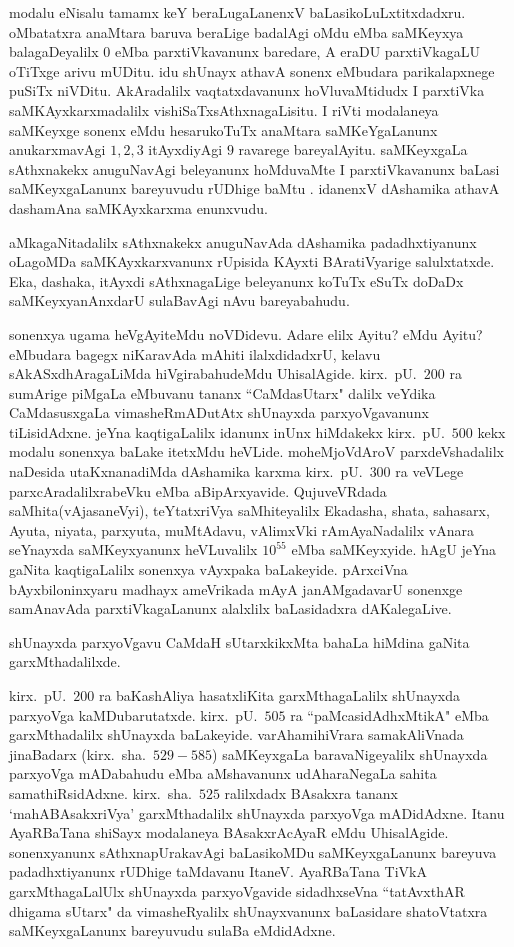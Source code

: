 modalu eNisalu tamamx keY beraLugaLanenxV baLasikoLuLxtitxdadxru. oMbatatxra anaMtara baruva beraLige badalAgi oMdu eMba saMKeyxya balagaDeyalilx $0$ eMba parxtiVkavanunx baredare, A eraDU parxtiVkagaLU oTiTxge arivu mUDitu. idu shUnayx athavA sonenx eMbudara parikalapxnege puSiTx niVDitu. AkAradalilx vaqtatxdavanunx hoVluvaMtidudx I parxtiVka saMKAyxkarxmadalilx vishiSaTxsAthxnagaLisitu. I riVti modalaneya saMKeyxge sonenx eMdu hesarukoTuTx anaMtara saMKeYgaLanunx anukarxmavAgi $1,2,3$ itAyxdi\-yAgi $9$ ravarege bareyalAyitu. saMKeyxgaLa sAthxnakekx anuguNavAgi beleyanunx hoMdu\-vaMte I parxtiVkavanunx baLasi saMKeyxgaLanunx bareyuvudu rUDhige baMtu . idanenxV dAshamika athavA dashamAna saMKAyxkarxma enunxvudu.

aMkagaNitadalilx sAthxnakekx anuguNavAda dAshamika padadhxtiyanunx oLagoMDa saMKAyx\-karxvanunx rUpisida KAyxti BAratiVyarige salulxtatxde. Eka, dashaka, itAyxdi sAthxnagaLige bele\-yanunx koTuTx eSuTx doDaDx saMKeyxyanAnxdarU sulaBavAgi nAvu bareyabahudu.

sonenxya ugama heVgAyiteMdu noVDidevu. Adare elilx Ayitu? eMdu Ayitu? eMbudara bagegx niKaravAda mAhiti ilalxdidadxrU, kelavu sAkASxdhAragaLiMda hiVgirabahudeMdu UhisalAgide. kirx.~pU.\ $200$ ra sumArige piMgaLa eMbuvanu tananx ``CaMdasUtarx" dalilx veYdika CaMdasusxgaLa vimasheRmADutAtx shUnayxda parxyoVgavanunx tiLisidAdxne. jeYna kaqtigaLalilx idanunx inUnx hiMdakekx kirx.~pU.\ $500$ kekx modalu sonenxya baLake itetxMdu heVLide. moheMjoVdAroV parxdeVshadalilx naDesida utaKxnanadiMda dAshamika karxma kirx.~pU.\ $300$ ra veVLege parxcAradalilxrabeVku eMba aBipArxyavide. QujuveVRdada saMhita(vAjasaneVyi), teYtatxriVya saMhiteyalilx Ekadasha, shata, sahasarx, Ayuta, niyata, parxyuta, muMtAdavu, vAlimxVki rAmAyaNadalilx vAnara seYnayxda saMKeyxyanunx heVLuvalilx $10^{55}$ eMba saMKeyxyide. hAgU jeYna gaNita kaqtigaLalilx sonenxya vAyxpaka baLakeyide. pArxciVna bAyxbiloninxyaru madhayx ameVrikada mAyA janAMgadavarU sonenxge samAnavAda parxtiVkagaLanunx alalxlilx baLasidadxra dAKalegaLive. 

shUnayxda parxyoVgavu CaMdaH sUtarxkikxMta bahaLa hiMdina gaNita garxMthadalilxde.

kirx.~pU.\ $200$ ra baKashAliya hasatxliKita garxMthagaLalilx shUnayxda parxyoVga kaMDu\-barutatxde. kirx.~pU.\ $505$ ra ``paMcasidAdhxMtikA" eMba garxMthadalilx shUnayxda baLakeyide. varAha\-mihiVrara samakAliVnada jinaBadarx (kirx.~sha.\ $529-585$) saMKeyxgaLa baravaNige\-yalilx shUnayxda parxyoVga mADabahudu eMba aMshavanunx udAharaNegaLa sahita samathiRsidAdxne. kirx.~sha.\ $525$ ralilxdadx BAsakxra tananx `mahABAsakxriVya' garxMthadalilx shUnayxda parxyoVga mADidAdxne. Itanu AyaRBaTana shiSayx modalaneya BAsakxrAcAyaR eMdu UhisalAgide. sonenxyanunx sAthxnapUrakavAgi baLasikoMDu saMKeyxgaLanunx bareyuva padadhxtiyanunx rUDhige taMdavanu ItaneV. AyaRBaTana TiVkA garxMthagaLalUlx shUnayxda parxyoVgavide sidadhxseVna ``tatAvxthAR dhigama sUtarx" da vimasheRyalilx shUnayx\-vanunx baLasidare shatoVtatxra saMKeyxgaLanunx bareyuvudu sulaBa eMdidAdxne.


